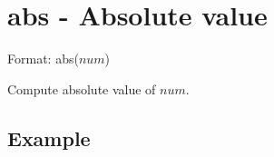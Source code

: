 
%

\section{abs - Absolute value\label{sect:abs}}

Format: abs($num$)

Compute absolute value of $num$.

\subsection*{Example}


%

